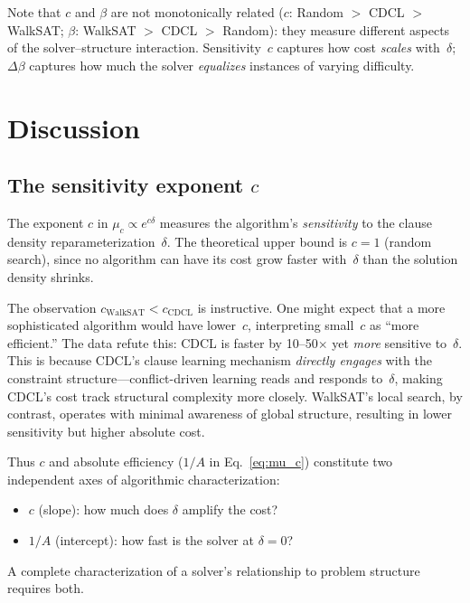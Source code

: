 \documentclass[11pt,a4paper]{article}
\newcommand{\mc}{\mu_c}
\begin{document}
Note that $c$ and $\beta$ are not monotonically related
($c$: Random $>$ CDCL $>$ WalkSAT;
$\beta$: WalkSAT $>$ CDCL $>$ Random):
they measure different aspects of the solver--structure interaction.
Sensitivity~$c$ captures how cost \emph{scales} with~$\delta$;
$\Delta\beta$ captures how much the solver \emph{equalizes}
instances of varying difficulty.


\section{Discussion}
\label{sec:discussion}

\subsection{The sensitivity exponent $c$}

The exponent $c$ in $\mc \propto e^{c\delta}$ measures
the algorithm's \emph{sensitivity} to the clause density
reparameterization~$\delta$.
The theoretical upper bound is $c = 1$ (random search),
since no algorithm can have its cost grow faster with~$\delta$
than the solution density shrinks.

The observation $c_{\text{WalkSAT}} < c_{\text{CDCL}}$ is instructive.
One might expect that a more sophisticated algorithm would have
lower~$c$, interpreting small~$c$ as ``more efficient.''
The data refute this: CDCL is faster by 10--50$\times$
yet \emph{more} sensitive to~$\delta$.
This is because CDCL's clause learning mechanism
\emph{directly engages} with the constraint structure---conflict-driven
learning reads and responds to~$\delta$, making CDCL's cost
track structural complexity more closely.
WalkSAT's local search, by contrast, operates with minimal
awareness of global structure, resulting in lower sensitivity
but higher absolute cost.

Thus $c$ and absolute efficiency ($1/A$ in Eq.~\ref{eq:mu_c})
constitute two independent axes of algorithmic characterization:
\begin{itemize}
\item $c$ (slope): how much does $\delta$ amplify the cost?
\item $1/A$ (intercept): how fast is the solver at $\delta = 0$?
\end{itemize}
A complete characterization of a solver's relationship to
problem structure requires both.
\end{document}
